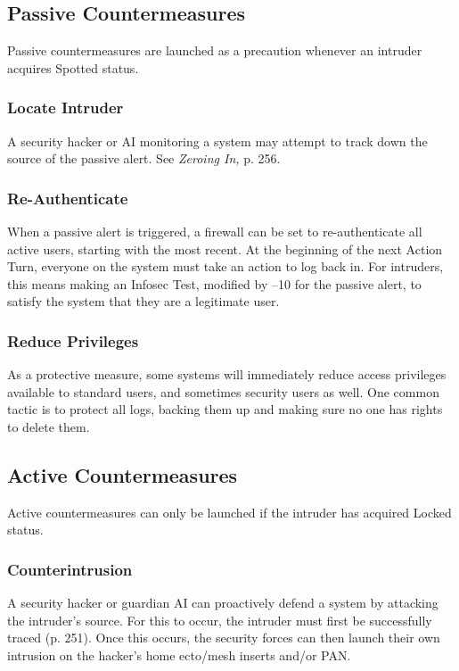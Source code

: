 \subsection{Passive Countermeasures}

Passive countermeasures are launched as a precaution 
whenever an intruder acquires Spotted status.

\subsubsection{Locate Intruder}

A security hacker or AI monitoring a system may attempt
to track down the source of the passive alert.
See \textit{Zeroing In,} p. 256.

\subsubsection{Re-Authenticate}

When a passive alert is triggered, a firewall can be set 
to re-authenticate all active users, starting with the 
most recent. At the beginning of the next Action Turn, 
everyone on the system must take an action to log 
back in. For intruders, this means making an Infosec 
Test, modified by –10 for the passive alert, to satisfy 
the system that they are a legitimate user.

\subsubsection{Reduce Privileges}

As a protective measure, some systems will immediately
reduce access privileges available to standard
users, and sometimes security users as well. One 
common tactic is to protect all logs, backing them up 
and making sure no one has rights to delete them.

\subsection{Active Countermeasures}

Active countermeasures can only be launched if the 
intruder has acquired Locked status.

\subsubsection{Counterintrusion}

A security hacker or guardian AI can proactively 
defend a system by attacking the intruder's source. For 
this to occur, the intruder must first be successfully 
traced (p. 251). Once this occurs, the security forces 
can then launch their own intrusion on the hacker's 
home ecto/mesh inserts and/or PAN.

